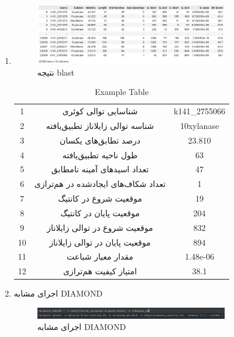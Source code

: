 \begin{enumerate}
            \item {}
                \begin{figure}[H]
                    \centering
                    \includegraphics[width=0.8\textwidth]{images/blast_result.jpg} %
                    \caption{نتیجه blast }
                    \label{fig:run_blast}
                \end{figure}
                \begin{table}[H]
                    \centering
                    \begin{tabular}{|c|c|c|}
                        \hline
                        1 & شناسایی توالی کوئری & k141\_2755066 \\
                        2 & شناسه توالی زایلاناز تطبیق‌یافته & 10xylanase \\
                        3 & درصد تطابق‌های یکسان & 23.810 \\
                        4 & طول ناحیه تطبیق‌یافته & 63 \\
                        5 & تعداد اسیدهای آمینه نامطابق & 47 \\
                        6 & تعداد شکاف‌های ایجادشده در هم‌ترازی & 1 \\
                        7 & موقعیت شروع در کانتیگ & 19 \\
                        8 & موقعیت پایان در کانتیگ & 204 \\
                        9 & موقعیت شروع در توالی زایلاناز & 832 \\
                        10 & موقعیت پایان در توالی زایلاناز & 894 \\
                        11 & مقدار معیار شباعت &  1.48e-06\\
                        12 & امتیاز کیفیت هم‌ترازی & 38.1 \\
                        \hline
                    \end{tabular}
                    \caption{Example Table}
                    \label{tab:example}
                \end{table}

            \item اجرای مشابه DIAMOND
                \begin{figure}[H]
                    \centering
                    \includegraphics[width=0.8\textwidth]{images/run_diamond.jpg} %
                    \caption{اجرای مشابه DIAMOND}
                    \label{fig:run_diamond}
                \end{figure}

        \end{enumerate}
